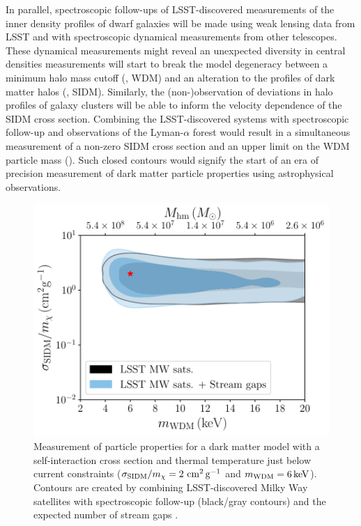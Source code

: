 In parallel, spectroscopic follow-ups of LSST-discovered measurements of the inner density profiles of dwarf galaxies will be made using weak lensing data from LSST and with spectroscopic dynamical measurements from other telescopes. These dynamical measurements might reveal an unexpected diversity in central densities measurements will start to break the model degeneracy between a minimum halo mass cutoff (\eg, WDM) and an alteration to the profiles of dark matter halos (\eg, SIDM).
Similarly, the (non-)observation of deviations in halo profiles of galaxy clusters will be able to inform the velocity dependence of the SIDM cross section.
Combining the LSST-discovered systems with spectroscopic follow-up and observations of the Lyman-$\alpha$ forest would result in a simultaneous measurement of a non-zero SIDM cross section and an upper limit on the WDM particle mass ().
Such closed contours would signify the start of an era of precision measurement of dark matter particle properties using astrophysical observations.

\begin{figure}
\centering
\includegraphics[width=0.6\columnwidth]{figures/WDM_SIDM_discovery_test.pdf}
\caption{\label{fig:sidm_wdm_disc} Measurement of particle properties for a dark matter model with a self-interaction cross section and thermal temperature just below current constraints ($\sigma_{\rm SIDM}/m_\chi = 2 \mathrm{\,\mathrm{\,cm}^2\mathrm{\,g}^{-1}}$ and $m_{\rm WDM} = 6\mathrm{\,keV}$). Contours are created by combining LSST-discovered Milky Way satellites with spectroscopic follow-up (black/gray contours) and the expected number of stream gaps .
 
}
\end{figure}


